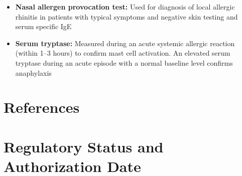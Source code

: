 \begin{itemize}
  \item \textbf{Nasal allergen provocation test:} Used for diagnosis of local allergic rhinitis in patients with typical symptoms and negative skin testing and serum specific IgE
  \item \textbf{Serum tryptase:} Measured during an acute systemic allergic reaction (within 1--3 hours) to confirm mast cell activation. An elevated serum tryptase during an acute episode with a normal baseline level confirms anaphylaxis
\end{itemize}

\section*{References}



\clearpage
\section*{Regulatory Status and Authorization Date}

\clearpage
